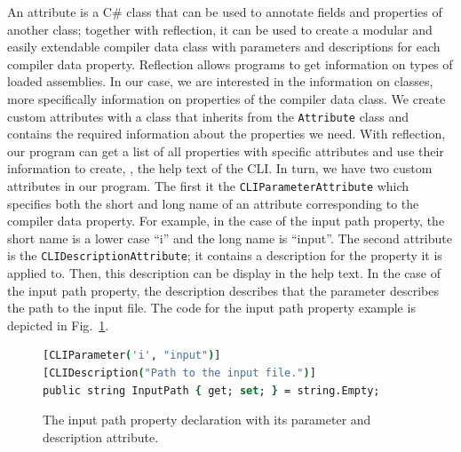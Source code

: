 An attribute is a C\# class that can be used to annotate fields and properties of another class; together with reflection, it can be used to create a modular and easily extendable compiler data class with parameters and descriptions for each compiler data property. Reflection allows programs to get information on types of loaded assemblies. In our case, we are interested in the information on classes, more specifically information on properties of the compiler data class. We create custom attributes with a class that inherits from the \texttt{Attribute} class and contains the required information about the properties we need. With reflection, our program can get a list of all properties with specific attributes and use their information to create, \eg, the help text of the CLI. In turn, we have two custom attributes in our program. The first it the \texttt{CLIParameterAttribute} which specifies both the short and long name of an attribute corresponding to the compiler data property. For example, in the case of the input path property, the short name is a lower case ``i'' and the long name is ``input''. The second attribute is the \texttt{CLIDescriptionAttribute}; it contains a description for the property it is applied to. Then, this description can be display in the help text. In the case of the input path property, the description describes that the parameter describes the path to the input file. The code for the input path property example is depicted in Fig.~\ref{fig:implementation_inputPathAttribute}.

\begin{figure}[htp]
    \centering
    \begin{lstlisting}[language=csh]
[CLIParameter('i', "input")]
[CLIDescription("Path to the input file.")]
public string InputPath { get; set; } = string.Empty;
    \end{lstlisting}
    \caption{The input path property declaration with its parameter and description attribute.}
    \label{fig:implementation_inputPathAttribute}
\end{figure}

